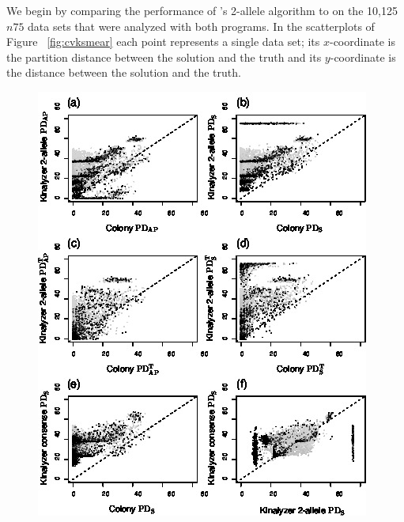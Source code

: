 We begin by comparing the performance of  \kinalyzer{}'s 2-allele algorithm to \colony{} on the 10,125 
$n75$ data sets that were analyzed with both programs.  In the scatterplots of Figure~
\ref{fig:cvksmear} each point represents a single data set; its $x$-coordinate is the partition 
distance between the \colony{} solution and the truth and its $y$-coordinate is the distance between 
the \kinalyzer{} solution and the truth.


\begin{figure}
\begin{center}
\includegraphics[width=.8\textwidth]{images/various_kin_smear.jpg}  %
\end{center}
\newcommand{\cvksmearcaption}{Scatterplots assessing performance of \kinalyzer{}.  {\em a}--{\em d} present comparisons of 
\colony{} versus \kinalyzer{}'s 2-allele algorithm for 10,125 simulated data sets, showing values of $
\W$, $\PDS$, $\WT$, and $\PDST$, respectively.  Thus, {\em b} and {\em d} penalize \kinalyzer{} for 
solutions that are not partitions, and {\em c} and {\em d} use the trimmed partition distances to 
}
\end{figure}
